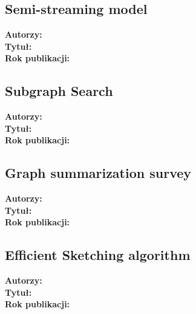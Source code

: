 \documentclass{article}
\begin{document}
        \subsection{Semi-streaming model\cite{Feigenbaum_Kannan_McGregor_Suri_Zhang_2005}}
            \textbf{Autorzy: } \\
            \textbf{Tytuł: } \\
            \textbf{Rok publikacji: } \\

        \subsection{Subgraph Search\cite{Li_Zou_Ozsu_Zhao_2019}}
            \textbf{Autorzy: } \\
            \textbf{Tytuł: } \\
            \textbf{Rok publikacji: } \\

        \subsection{Graph summarization survey\cite{Liu_Safavi_Dighe_Koutra_2018}}
            \textbf{Autorzy: } \\
            \textbf{Tytuł: } \\
            \textbf{Rok publikacji: } \\

        \subsection{Efficient Sketching algorithm\cite{Lemiesz_2023}}
            \textbf{Autorzy: } \\
            \textbf{Tytuł: } \\
            \textbf{Rok publikacji: } \\

     
    
\end{document}
